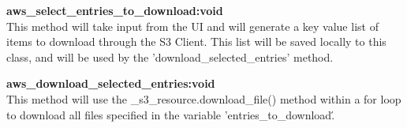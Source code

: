 \textbf{aws\_select\_entries\_to\_download:void} \\
    This method will take input from the UI and will generate a key value list of items to download through the S3 Client. This list will be saved locally to this class,
    and will be used by the 'download\_selected\_entries' method.

\textbf{aws\_download\_selected\_entries:void} \\
    This method will use the \_s3\_resource.download\_file() method within a for loop to download all files specified in the variable 'entries\_to\_download\'.

